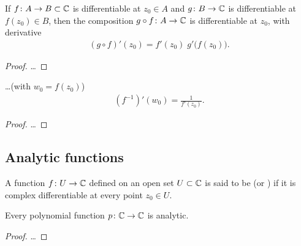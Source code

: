 \begin{lemma}
  \label{lem:chain_rule}
  If $f \colon A \to B \subset \mathbb{C}$ is differentiable at $z_0 \in A$
  and $g \colon B \to \mathbb{C}$ is differentiable at $f(z_0) \in B$,
  then the composition $g \circ f \colon A \to \mathbb{C}$ is differentiable at $z_0$,
  with derivative
  \begin{align*}
    (g \circ f)'(z_0) = f'(z_0) \; g'\big( f(z_0) \big) .
  \end{align*}
\end{lemma}
\begin{proof}
  \ldots
\end{proof}

\begin{lemma}
  \label{lem:inverse_derivative}
  \ldots (with $w_0 = f(z_0)$)
  \begin{align*}
    (f^{-1})'(w_0) = \frac{1}{f'(z_0)} .
  \end{align*}
\end{lemma}
\begin{proof}
  \ldots
\end{proof}


\subsection{Analytic functions}

\begin{definition}
  \label{def:analytic_function}
  A function $f \colon U \to \mathbb{C}$ defined on an open set $U \subset \mathbb{C}$ is
  said to be  (or ) if it is complex
  differentiable at every point $z_0 \in U$.
\end{definition}

\begin{lemma}
  \label{lem:polynomial_analytic}
  Every polynomial function $p \colon \mathbb{C} \to \mathbb{C}$ is analytic.
\end{lemma}
\begin{proof}
  \ldots
\end{proof}

